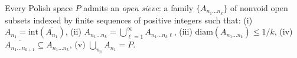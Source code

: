 Every Polish space $P$ admits an \emph{open sieve}: a family $\{A_{n_1\ldots n_k}\}$ of nonvoid open subsets indexed by finite sequences of positive integers such that: (i) $A_{n_1} = \text{int}(\overline{A_{n_1}})$, (ii) $A_{n_1\ldots n_k} = \bigcup_{\ell=1}^\infty A_{n_1\ldots n_k\ell}$, (iii) $\text{diam}(A_{n_1\ldots n_k}) \leqslant 1/k$, (iv) $\overline{A_{n_1\ldots n_{k+1}}} \subseteq A_{n_1\ldots n_k}$, (v) $\bigcup_{n_1} A_{n_1} = P$.
